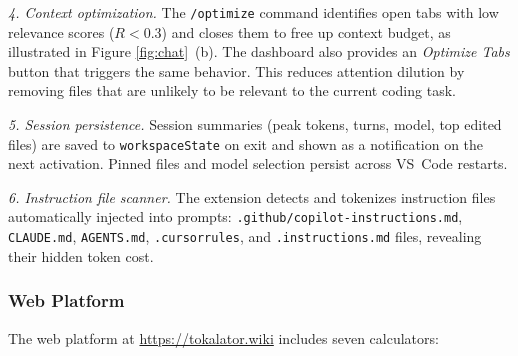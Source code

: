\documentclass[a4paper,fleqn]{cas-dc}
\begin{document}
\textit{4. Context optimization.}
The \texttt{/optimize} command identifies open tabs with low relevance scores ($R < 0.3$) and closes them to free up context budget, as illustrated in Figure \ref{fig:chat}~(b). The dashboard also provides an \textit{Optimize Tabs} button that triggers the same behavior. This reduces attention dilution by removing files that are unlikely to be relevant to the current coding task.

\textit{5. Session persistence.}
Session summaries (peak tokens, turns, model, top edited files) are saved to \texttt{workspaceState} on exit and shown as a notification on the next activation.
Pinned files and model selection persist across VS~Code restarts.

\textit{6. Instruction file scanner.}
The extension detects and tokenizes instruction files automatically injected into prompts: \texttt{.github/copilot-instructions.md}, \texttt{CLAUDE.md}, \texttt{AGENTS.md}, \texttt{.cursorrules}, and \texttt{.instructions.md} files, revealing their hidden token cost.

\subsubsection{Web Platform}

The web platform at \url{https://tokalator.wiki} includes seven calculators:
\end{document}
